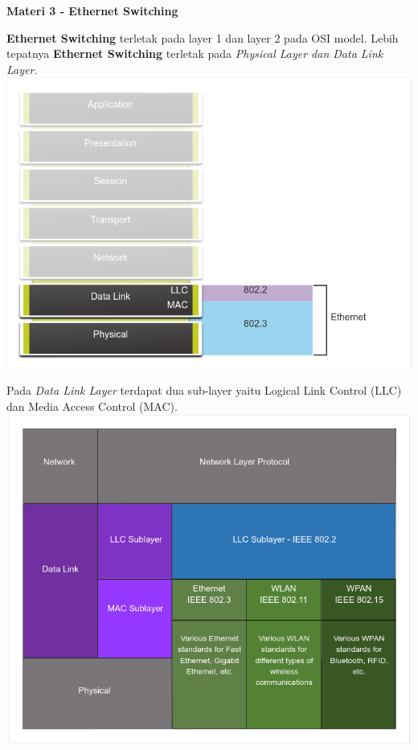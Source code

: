 \documentclass{article}
\begin{document}
    \begin{flushleft}
        \textbf{Materi 3 - Ethernet Switching}
        \newline

        \textbf{Ethernet Switching} terletak pada layer 1 dan layer 2 pada OSI model.
        Lebih tepatnya \textbf{Ethernet Switching} terletak pada \textit{Physical Layer dan Data Link Layer}.
        \includegraphics[scale=0.5]{3-ethernet-layer.png}

        Pada \textit{Data Link Layer} terdapat dua sub-layer yaitu Logical Link Control (LLC) dan Media Access Control (MAC).
        \includegraphics[scale=0.6]{3-llc-mac.png}


\end{flushleft}
\end{document}
